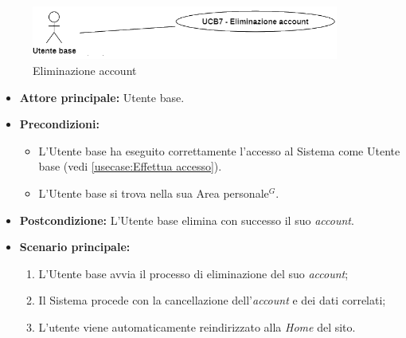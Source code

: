 \newpage
{}
\label{usecase:Eliminazione account}

\begin{figure}[h]
	\centering
	\includegraphics[width=0.9\textwidth]{./uml/UCB7.png} 
	\caption{Eliminazione account}
	\label{fig:UCB7}
  \end{figure}

\begin{itemize}
	\item \textbf{Attore principale:} Utente base.

	\item \textbf{Precondizioni:}
	      \begin{itemize}
		      \item L'Utente base ha eseguito correttamente l'accesso al Sistema come Utente base (vedi \autoref{usecase:Effettua accesso}).
		      \item L'Utente base si trova nella sua Area personale$^G$.
	      \end{itemize}

	\item \textbf{Postcondizione:} L'Utente base elimina con successo il suo \textit{account}.

	\item \textbf{Scenario principale:}
	      \begin{enumerate}
		      \item L'Utente base avvia il processo di eliminazione del suo \textit{account};
		      \item Il Sistema procede con la cancellazione dell'\textit{account} e dei dati correlati;
		      \item L'utente viene automaticamente reindirizzato alla \textit{Home} del sito.
	      \end{enumerate}
\end{itemize}
